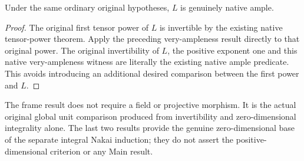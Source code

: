 \begin{theorem}
\label{thm:seshadri-original-dimzero-ample}
\leanok
Under the same ordinary original hypotheses, $L$ is genuinely native
ample.
\end{theorem}
\begin{proof}
The original first tensor power of $L$ is invertible by the existing
native tensor-power theorem. Apply the preceding very-ampleness result
directly to that original power. The original invertibility of $L$,
the positive exponent one and this native very-ampleness witness are
literally the existing native ample predicate. This avoids introducing
an additional desired comparison between the first power and $L$.
\end{proof}

The frame result does not require a field or projective morphism. It is
the actual original global unit comparison produced from invertibility
and zero-dimensional integrality alone. The last two results provide
the genuine zero-dimensional base of the separate integral Nakai
induction; they do not assert the positive-dimensional criterion or any
Main result.
